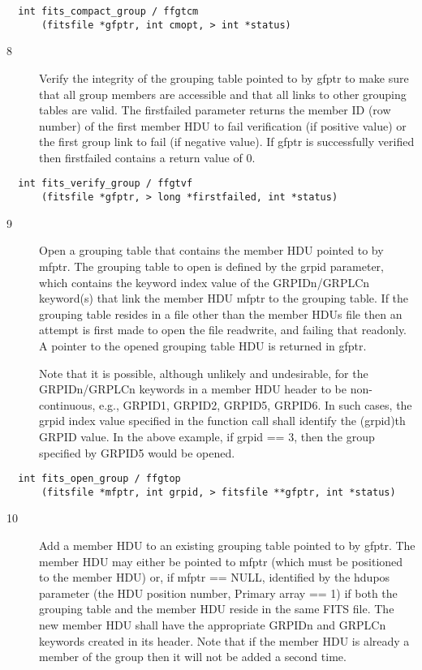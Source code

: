 \documentclass[11pt]{book}
\begin{document}
\begin{verbatim}
  int fits_compact_group / ffgtcm
      (fitsfile *gfptr, int cmopt, > int *status)
\end{verbatim}

\begin{description}
\item[8 ]Verify the integrity of the grouping table pointed to by gfptr to make
   sure that all group members are accessible and that all links to other
   grouping tables are valid. The firstfailed parameter returns the member
   ID (row number) of the first member HDU to fail verification (if positive
   value) or the first group link to fail (if negative value). If gfptr is
  successfully verified then firstfailed contains a return value of 0. \label{ffgtvf}
\end{description}

\begin{verbatim}
  int fits_verify_group / ffgtvf
      (fitsfile *gfptr, > long *firstfailed, int *status)
\end{verbatim}

\begin{description}
\item[9 ] Open a grouping table that contains the member HDU pointed to by mfptr.
    The grouping table to open is defined by the grpid parameter, which
    contains the keyword index value of the GRPIDn/GRPLCn keyword(s) that
    link the member HDU mfptr to the grouping table. If the grouping table
    resides in a file other than the member HDUs file then an attempt is
    first made to open the file readwrite, and failing that readonly. A
    pointer to the opened grouping table HDU is returned in gfptr.

    Note that it is possible, although unlikely and undesirable, for the
    GRPIDn/GRPLCn keywords in a member HDU header to be non-continuous, e.g.,
    GRPID1, GRPID2, GRPID5, GRPID6. In such cases, the grpid index value
    specified in the function call shall identify the (grpid)th GRPID value.
    In the above example, if grpid == 3, then the group specified by GRPID5
   would be opened. \label{ffgtop}
\end{description}

\begin{verbatim}
  int fits_open_group / ffgtop
      (fitsfile *mfptr, int grpid, > fitsfile **gfptr, int *status)
\end{verbatim}

\begin{description}
\item[10]  Add a member HDU to an existing grouping table pointed to by gfptr.
   The member HDU may either be pointed to mfptr (which must be positioned
   to the member HDU) or, if mfptr == NULL, identified by the hdupos parameter
   (the HDU position number, Primary array == 1) if both the grouping table
   and the member HDU reside in the same FITS file. The new member HDU shall
   have the appropriate GRPIDn and GRPLCn keywords created in its header.
   Note that if the member HDU is already a member of the group then it will
  not be added a second time. \label{ffgtam}
\end{description}
\end{document}
